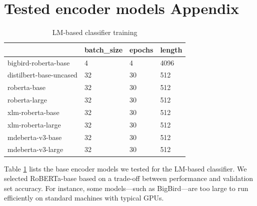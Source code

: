 \documentclass[11pt]{article}
\begin{document}
\section{Tested encoder models Appendix}
\label{sec:appendix2}
\begin{table}[]
		\small
		\caption{LM-based classifier training}
		\begin{tabular}{@{}l|lll@{}}
			\toprule
			& \multicolumn{1}{l|}{batch\_size} & \multicolumn{1}{l|}{epochs} & \multicolumn{1}{l|}{length} \\ \midrule
			\multicolumn{1}{|l|}{bigbird-roberta-base} & 4                                & 4                           & 4096                             \\ \cmidrule(r){1-1}
			\multicolumn{1}{|l|}{distilbert-base-uncased}     & 32                               & 30                          & 512                              \\ \cmidrule(r){1-1}
			\multicolumn{1}{|l|}{roberta-base}                & 32                               & 30                          & 512                              \\ 
			\cmidrule(r){1-1}
			\multicolumn{1}{|l|}{roberta-large}                & 32                               & 30                          & 512                              \\ 
			\cmidrule(r){1-1}
			\multicolumn{1}{|l|}{xlm-roberta-base}            & 32                               & 30                          & 512                              \\ \cmidrule(r){1-1}
			\multicolumn{1}{|l|}{xlm-roberta-large}           & 32                               & 30                          & 512                              \\ \cmidrule(r){1-1}
			\multicolumn{1}{|l|}{mdeberta-v3-base}  & 32                               & 30                          & 512                              \\ \cmidrule(r){1-1}
			\multicolumn{1}{|l|}{mdeberta-v3-large} & 32                               & 30                          & 512                              \\ \bottomrule
		\end{tabular}
		\label{table:3}
	\end{table}
	
	Table \ref{table:3} lists the base encoder models we tested for the LM-based classifier. We selected RoBERTa-base based on a trade-off between performance and validation set accuracy. For instance, some models—such as BigBird—are too large to run efficiently on standard machines with typical GPUs.
\end{document}
